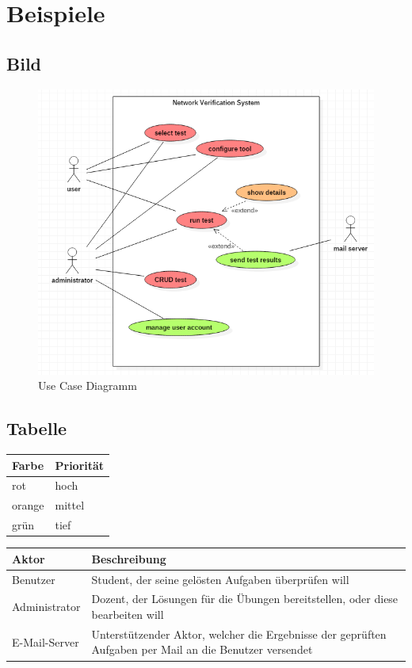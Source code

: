 
\section{Beispiele}

\subsection{Bild}

\begin{figure}[H]
	\includegraphics[width=\textwidth, height=\textheight, keepaspectratio]{images/UseCaseDiagramm.png}
	\caption{Use Case Diagramm}
\end{figure}



\subsection{Tabelle}

\begin{tabular}{| p{1cm} | p{1.3cm}|}
	\hline
	\textbf{Farbe} & \textbf{Priorität} \\
	\hline	
	rot & hoch \\
	\hline
	orange & mittel \\
	\hline
	grün & tief \\
	\hline
\end{tabular}


\begin{tabularx}{\textwidth}{| X | X |}
	\hline
	\textbf{Aktor} & \textbf{Beschreibung} \\
	\hline
	Benutzer & Student, der seine gelösten Aufgaben überprüfen will \\
	\hline
	Administrator & Dozent, der Lösungen für die Übungen bereitstellen, oder diese bearbeiten will \\
	\hline
	E-Mail-Server & Unterstützender Aktor, welcher die Ergebnisse der geprüften Aufgaben per Mail an die Benutzer versendet \\
	\hline
\end{tabularx}


